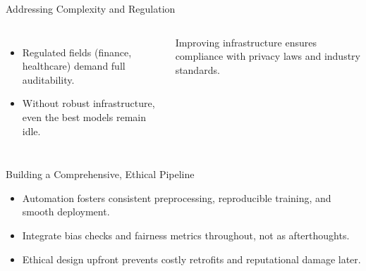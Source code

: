 \documentclass[aspectratio=169]{beamer}
\begin{document}
\begin{frame}{Addressing Complexity and Regulation}
\begin{columns}[T,onlytextwidth]
\begin{itemize}
\item Regulated fields (finance, healthcare) demand full auditability.
\item Without robust infrastructure, even the best models remain idle.
\end{itemize}

\small Improving infrastructure ensures compliance with privacy laws and industry standards.
\end{columns}
\end{frame}

\begin{frame}{Building a Comprehensive, Ethical Pipeline}
\begin{itemize}
\item Automation fosters consistent preprocessing, reproducible training, and smooth deployment.
\item Integrate bias checks and fairness metrics throughout, not as afterthoughts.
\item Ethical design upfront prevents costly retrofits and reputational damage later.
\end{itemize}
\end{frame}
\end{document}
